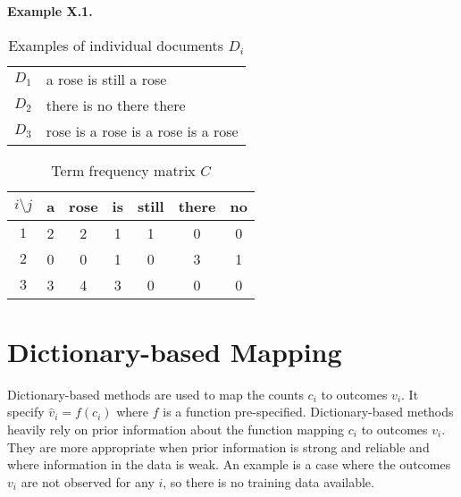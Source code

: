 \begin{examplebox}
    \textbf{Example X.1.} 
\begin{table}[H]
    \centering
    \begin{tabular}{|c|p{5cm}|}
        $D_1$ & a rose is still a rose \\
        $D_2$ & there is no there there \\
        $D_3$ & rose is a rose is a rose is a rose \\
    \end{tabular}
    \caption{Examples of individual documents $D_i$}
\end{table}

\begin{table}[H]
    \centering
    \begin{tabular}{c|c|c|c|c|c|c}
        $i\setminus j$ & a & rose & is & still & there & no \\
        \hline
        $1$ & 2 & 2 & 1 & 1 & 0 & 0 \\
        $2$ & 0 & 0 & 1 & 0 & 3 & 1  \\
        $3$ & 3 & 4 & 3 & 0 & 0 & 0  \\
    \end{tabular}
    \caption{Term frequency matrix $C$}
\end{table}
\end{examplebox}



\section{Dictionary-based Mapping}

Dictionary-based methods are used to map the
counts $c_i$ to outcomes $v_i$.
It specify $\hat{v}_i = f(c_i)$ where $f$ is a 
function pre-specified.
Dictionary-based methods heavily rely 
on prior information about the function mapping 
$c_i$ to outcomes $v_i$.
They are more appropriate when prior information 
is strong and reliable and where information in 
the data is weak.
An example is a case where the outcomes $v_i$ 
are not observed for any $i$, so there is 
no training data available. 


